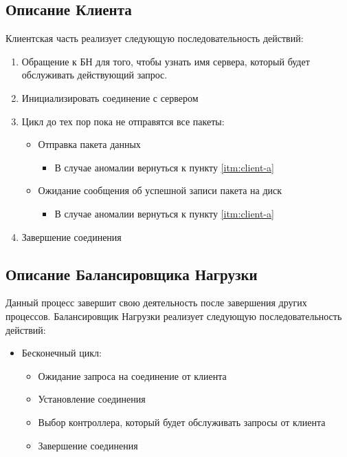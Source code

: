 \subsection{Описание Клиента}
Клиентская часть реализует следующую последовательность действий:

\begin{enumerate}
\item\label{itm:client-a} Обращение к БН для того, чтобы узнать имя сервера, который будет обслуживать действующий запрос. 
\item Инициализировать соединение с сервером 

\item Цикл до тех пор пока не отправятся все пакеты:
	\begin{itemize}
		\item Отправка пакета данных 
			\begin{itemize}
				\item В случае аномалии вернуться к пункту \ref{itm:client-a}
			\end{itemize}
		\item Ожидание сообщения об успешной записи пакета на диск
			\begin{itemize}
				\item В случае аномалии вернуться к пункту \ref{itm:client-a}
			\end{itemize}
	\end{itemize}
\item Завершение соединения
\end{enumerate}



\subsection{Описание Балансировщика Нагрузки}
Данный процесс завершит свою деятельность после завершения других процессов. Балансировщик Нагрузки реализует следующую последовательность действий: 

\begin{itemize}

\item Бесконечный цикл:
	\begin{itemize}
		\item Ожидание запроса на соединение от клиента
		\item Установление соединения
		\item Выбор контроллера, который будет обслуживать запросы от клиента
		\item  Завершение соединения
	\end{itemize}
\end{itemize}

